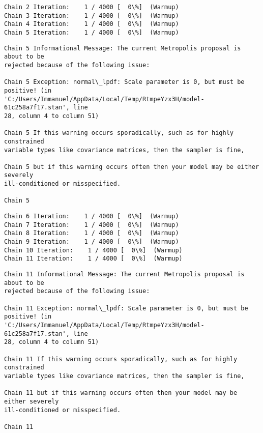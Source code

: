 \documentclass[11pt]{article}
\begin{document}
    \begin{Verbatim}[commandchars=\\\{\}]
Chain 2 Iteration:    1 / 4000 [  0\%]  (Warmup)
Chain 3 Iteration:    1 / 4000 [  0\%]  (Warmup)
Chain 4 Iteration:    1 / 4000 [  0\%]  (Warmup)
Chain 5 Iteration:    1 / 4000 [  0\%]  (Warmup)
    \end{Verbatim}

    \begin{Verbatim}[commandchars=\\\{\}]
Chain 5 Informational Message: The current Metropolis proposal is about to be
rejected because of the following issue:

Chain 5 Exception: normal\_lpdf: Scale parameter is 0, but must be positive! (in
'C:/Users/Immanuel/AppData/Local/Temp/RtmpeYzx3H/model-61c258a7f17.stan', line
28, column 4 to column 51)

Chain 5 If this warning occurs sporadically, such as for highly constrained
variable types like covariance matrices, then the sampler is fine,

Chain 5 but if this warning occurs often then your model may be either severely
ill-conditioned or misspecified.

Chain 5

    \end{Verbatim}

    \begin{Verbatim}[commandchars=\\\{\}]
Chain 6 Iteration:    1 / 4000 [  0\%]  (Warmup)
Chain 7 Iteration:    1 / 4000 [  0\%]  (Warmup)
Chain 8 Iteration:    1 / 4000 [  0\%]  (Warmup)
Chain 9 Iteration:    1 / 4000 [  0\%]  (Warmup)
Chain 10 Iteration:    1 / 4000 [  0\%]  (Warmup)
Chain 11 Iteration:    1 / 4000 [  0\%]  (Warmup)
    \end{Verbatim}

    \begin{Verbatim}[commandchars=\\\{\}]
Chain 11 Informational Message: The current Metropolis proposal is about to be
rejected because of the following issue:

Chain 11 Exception: normal\_lpdf: Scale parameter is 0, but must be positive! (in
'C:/Users/Immanuel/AppData/Local/Temp/RtmpeYzx3H/model-61c258a7f17.stan', line
28, column 4 to column 51)

Chain 11 If this warning occurs sporadically, such as for highly constrained
variable types like covariance matrices, then the sampler is fine,

Chain 11 but if this warning occurs often then your model may be either severely
ill-conditioned or misspecified.

Chain 11

    \end{Verbatim}
\end{document}
